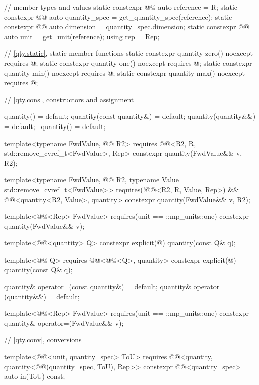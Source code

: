 \begin{codeblock}
{{  // member types and values
  static constexpr @@ auto reference = R;
  static constexpr @@ auto quantity_spec = get_quantity_spec(reference);
  static constexpr @@ auto dimension = quantity_spec.dimension;
  static constexpr @@ auto unit = get_unit(reference);
  using rep = Rep;

  // \ref{qty.static}, static member functions
  static constexpr quantity zero() noexcept
    requires @\seebelownc@;
  static constexpr quantity one() noexcept
    requires @\seebelownc@;
  static constexpr quantity min() noexcept
    requires @\seebelownc@;
  static constexpr quantity max() noexcept
    requires @\seebelownc@;

  // \ref{qty.cons}, constructors and assignment

  quantity() = default;
  quantity(const quantity&) = default;
  quantity(quantity&&) = default;
  ~quantity() = default;

  template<typename FwdValue, @@ R2>
    requires @@<R2{}, R, std::remove_cvref_t<FwdValue>, Rep>
  constexpr quantity(FwdValue&& v, R2);

  template<typename FwdValue, @@ R2, typename Value = std::remove_cvref_t<FwdValue>>
    requires(!@@<R2{}, R, Value, Rep>) &&
            @@<quantity<R2{}, Value>, quantity>
  constexpr quantity(FwdValue&& v, R2);

  template<@@<Rep> FwdValue>
    requires(unit == ::mp_units::one)
  constexpr quantity(FwdValue&& v);

  template<@@<quantity> Q>
  constexpr explicit(@\seebelownc@) quantity(const Q& q);

  template<@@ Q>
    requires @@<@@<Q>, quantity>
  constexpr explicit(@\seebelownc@) quantity(const Q& q);

  quantity& operator=(const quantity&) = default;
  quantity& operator=(quantity&&) = default;

  template<@@<Rep> FwdValue>
    requires(unit == ::mp_units::one)
  constexpr quantity& operator=(FwdValue&& v);

  // \ref{qty.conv}, conversions

  template<@@<unit, quantity_spec> ToU>
    requires @@<quantity, quantity<@@(quantity_spec, ToU{}), Rep>>
  constexpr @@<quantity_spec> auto in(ToU) const;

}}
\end{codeblock}
